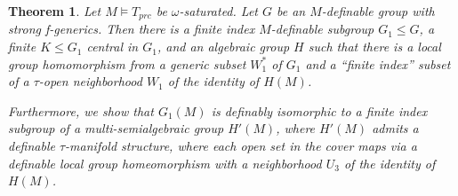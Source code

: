 \documentclass[12pt]{article}
\newtheorem{thm}{Theorem}[section]
\theoremstyle{definition}
\theoremstyle{mystyle}
\theoremstyle{remark}
\begin{document}

\begin{thm}\label{th_main}
Let $M \models T_{prc}$ be $\omega$-saturated. Let $G$ be an
$M$-definable group with strong f-generics. Then there is a finite
index $M$-definable subgroup $G_1 \leq G$, a finite $K\leq
G_1$ central in $G_1$, and an algebraic group $H$ such that there
is a local group homomorphism from a generic subset $W_1^*$ of
$G_1$ and a ``finite index'' subset of a $\tau$-open neighborhood
$W_1$ of the identity of $H(M)$.

Furthermore, we show that $G_1(M)$ is definably isomorphic to a
finite index subgroup of a multi-semialgebraic group $H'(M)$,
where $H'(M)$ admits a definable $\tau$-manifold structure, where
each open set in the cover maps via a definable local group
homeomorphism with a neighborhood $U_3$ of the identity of $H(M)$.
\end{thm}
\end{document}
